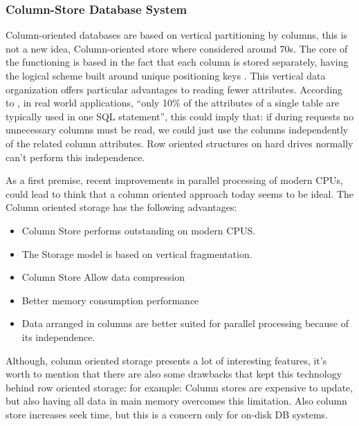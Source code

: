 \documentclass[12pt]{article} %
\begin{document}
\subsubsection{Column-Store Database System}

Column-oriented databases are based on vertical partitioning by columns, this is not a new idea, Column-oriented store where considered around 70s. The core of the functioning is based in the fact that each column is stored separately, having the logical scheme built around unique positioning keys \cite{krueger2011main}. This vertical data organization offers particular advantages to reading fewer attributes. According to \cite{Plattner}, in real world applications, ``only 10\% of the attributes of a single table are typically used in one SQL statement'', this could imply that: if during requests no unnecessary columns must be read, we could just use the columns independently of the related column attributes. Row oriented structures on hard drives normally can't perform this independence.

As a first premise, recent improvements in parallel processing of modern CPUs, could lead to think that a column oriented approach today seems to be ideal. The Column oriented storage has the following advantages: 

\begin{itemize}
  \item Column Store performs outstanding on modern CPUS.

  \item The Storage model is based on vertical fragmentation.

  \item Column Store Allow data compression

  \item Better memory consumption performance

  \item Data arranged in columns are better suited for parallel processing because of its independence.

\end{itemize}
   
Although, column oriented storage presents a lot of interesting features, it's worth to mention that there are also some drawbacks that kept this technology behind row oriented storage: for example: Column stores are expensive to update, but also having all data in main memory overcomes this limitation. Also column store increases seek time, but this is a concern only for on-disk DB systems.
\end{document}
